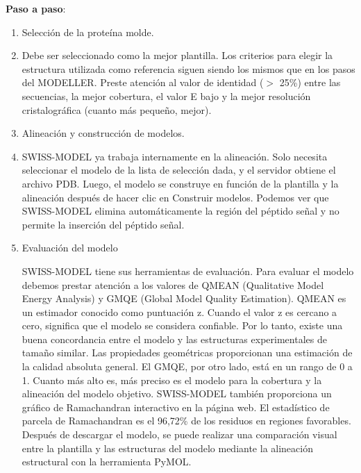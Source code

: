 \documentclass[11pt, letterpaper, spanish]{article}
\begin{document}
{{    \par \textbf{Paso a paso}:
\begin{enumerate}
    \item Selección de la proteína molde.
    \item Debe ser seleccionado como la mejor plantilla. Los criterios para elegir la estructura utilizada como referencia siguen siendo los mismos que en los pasos del MODELLER. Preste atención al valor de identidad ($>$ 25\%) entre las secuencias, la mejor cobertura, el valor E bajo y la mejor resolución cristalográfica (cuanto más pequeño, mejor).
    \item Alineación y construcción de modelos.
    \item SWISS-MODEL ya trabaja internamente en la alineación. Solo necesita seleccionar el modelo de la lista de selección dada, y el servidor obtiene el archivo PDB. Luego, el modelo se construye en función de la plantilla y la alineación después de hacer clic en Construir modelos. Podemos ver que SWISS-MODEL elimina automáticamente la región del péptido señal y no permite la inserción del péptido señal.
    \item Evaluación del modelo
    \par{SWISS-MODEL tiene sus herramientas de evaluación. Para evaluar el modelo debemos prestar atención a los valores de QMEAN (Qualitative Model Energy Analysis) y GMQE (Global Model Quality Estimation). QMEAN es un estimador conocido como puntuación z. Cuando el valor z es cercano a cero, significa que el modelo se considera confiable. Por lo tanto, existe una buena concordancia entre el modelo y las estructuras experimentales de tamaño similar. Las propiedades geométricas proporcionan una estimación de la calidad absoluta general. El GMQE, por otro lado, está en un rango de 0 a 1. Cuanto más alto es, más preciso es el modelo para la cobertura y la alineación del modelo objetivo. SWISS-MODEL también proporciona un gráfico de Ramachandran interactivo en la página web. El estadístico de parcela de Ramachandran es el 96,72\% de los residuos en regiones favorables. Después de descargar el modelo, se puede realizar una comparación visual entre la plantilla y las estructuras del modelo mediante la alineación estructural con la herramienta PyMOL.}
\end{enumerate}

}}
\end{document}
